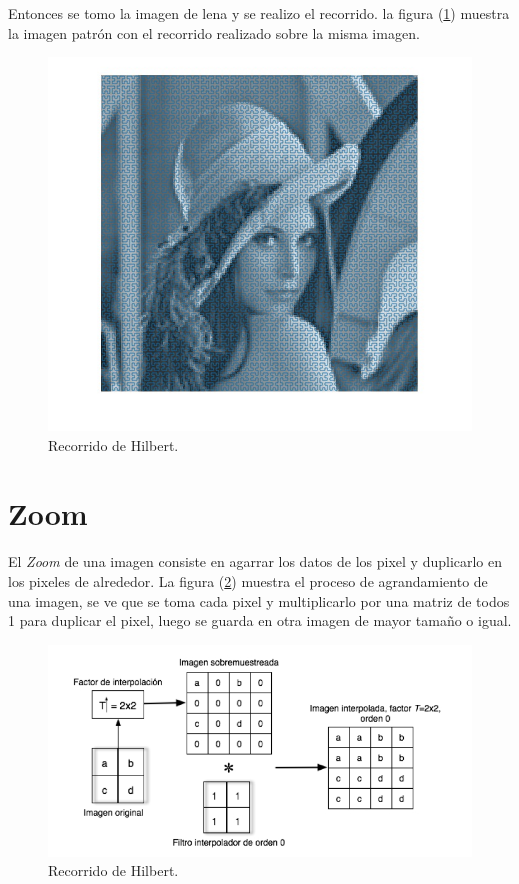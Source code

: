 Entonces se tomo la imagen de lena y se realizo el recorrido. la figura (\ref{fig:hilbert}) muestra la imagen patrón con el recorrido realizado sobre la misma imagen.

\begin{figure}[H]
	\centering
	\includegraphics[scale=0.5]{imagenes/hilbert.jpeg}

	\caption{Recorrido de Hilbert\label{fig:hilbert}.}
\end{figure}

\section{Zoom}

	El \textit{Zoom} de una imagen consiste en agarrar los datos de los pixel y duplicarlo en los pixeles de alrededor. La figura (\ref{fig:zoom}) muestra el proceso de agrandamiento de una imagen, se ve que se toma cada pixel y multiplicarlo por una matriz de todos 1 para duplicar el pixel, luego se guarda en otra imagen de mayor tamaño o igual.
	

\begin{figure}[H]
	\centering
	\includegraphics[scale=0.5]{imagenes/zoom0-sis.png}

	\caption{Recorrido de Hilbert\label{fig:zoom}.}
\end{figure}

